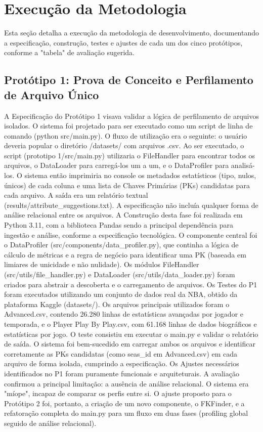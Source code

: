 \documentclass[12pt, a4paper]{article}
\begin{document}
\newpage
\section{Execução da Metodologia}
\label{sec:execucao-metodologia}

Esta seção detalha a execução da metodologia de desenvolvimento, documentando a especificação, construção, testes e ajustes de cada um dos cinco protótipos, conforme a "tabela" de avaliação sugerida.

\subsection{Protótipo 1: Prova de Conceito e Perfilamento de Arquivo Único} 
\label{subsec:prototipo1}

A Especificação do Protótipo 1 visava validar a lógica de perfilamento de arquivos isolados. 
O sistema foi projetado para ser executado como um script de linha de comando (python src/main.py). 
O fluxo de utilização era o seguinte: o usuário deveria popular o diretório /datasets/ com arquivos .csv. 
Ao ser executado, o script (prototipo 1/src/main.py) utilizaria o FileHandler para encontrar todos os arquivos, o DataLoader para carregá-los um a um, e o DataProfiler para analisá-los. 
O sistema então imprimiria no console os metadados estatísticos (tipo, nulos, únicos) de cada coluna e uma lista de Chaves Primárias (PKs) candidatas para cada arquivo. 
A saída era um relatório textual (results/attribute\_suggestions.txt). A especificação não incluía qualquer forma de análise relacional entre os arquivos. 
A Construção desta fase foi realizada em Python 3.11, com a biblioteca Pandas sendo a principal dependência para ingestão e análise, conforme a especificação tecnológica. 
O componente central foi o DataProfiler (src/components/data\_profiler.py), que continha a lógica de cálculo de métricas e a regra de negócio para identificar uma PK (baseada em limiares de unicidade e não nulidade).
Os módulos FileHandler (src/utils/file\_handler.py) e DataLoader (src/utils/data\_loader.py) foram criados para abstrair a descoberta e o carregamento de arquivos. 
Os Testes do P1 foram executados utilizando um conjunto de dados real da NBA, obtido da plataforma Kaggle (datasets/). 
Os arquivos principais utilizados foram o Advanced.csv, contendo 26.280 linhas de estatísticas avançadas por jogador e temporada, e o Player Play By Play.csv, com 61.168 linhas de dados biográficos e estatísticas por jogo. 
O teste consistiu em executar o main.py e validar o relatório de saída.
O sistema foi bem-sucedido em carregar ambos os arquivos e identificar corretamente as PKs candidatas (como seas\_id em Advanced.csv) em cada arquivo de forma isolada, cumprindo a especificação. 
Os Ajustes necessários identificados no P1 foram puramente funcionais e arquiteturais. A avaliação confirmou a principal limitação: a ausência de análise relacional.
O sistema era "míope", incapaz de comparar os perfis entre si. 
O ajuste proposto para o Protótipo 2 foi, portanto, a criação de um novo componente, o FKFinder, e a refatoração completa do main.py para um fluxo em duas fases (profiling global seguido de análise relacional). 
\end{document}
